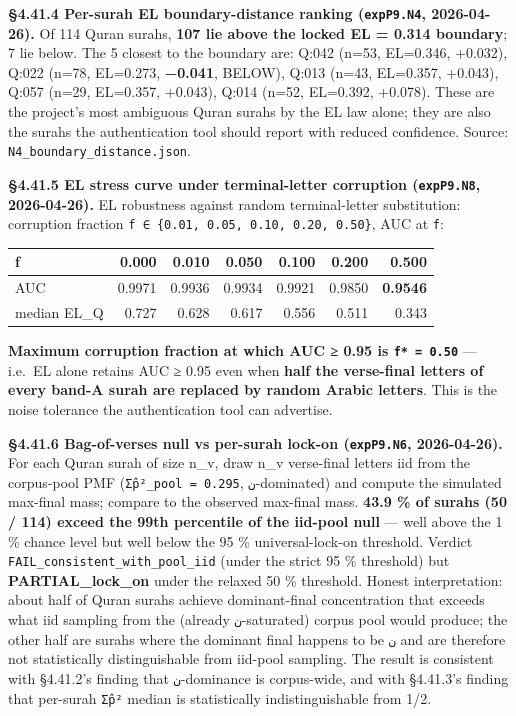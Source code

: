 \documentclass[
]{article}
\newcounter{none} %
\begin{document}
\textbf{§4.41.4 Per-surah EL boundary-distance ranking
(\texttt{expP9.N4}, 2026-04-26).} Of 114 Quran surahs, \textbf{107 lie
above the locked EL = 0.314 boundary}; 7 lie below. The 5 closest to the
boundary are: Q:042 (n=53, EL=0.346, +0.032), Q:022 (n=78, EL=0.273,
\textbf{−0.041}, BELOW), Q:013 (n=43, EL=0.357, +0.043), Q:057 (n=29,
EL=0.357, +0.043), Q:014 (n=52, EL=0.392, +0.078). These are the
project's most ambiguous Quran surahs by the EL law alone; they are also
the surahs the authentication tool should report with reduced
confidence. Source: \texttt{N4\_boundary\_distance.json}.

\textbf{§4.41.5 EL stress curve under terminal-letter corruption
(\texttt{expP9.N8}, 2026-04-26).} EL robustness against random
terminal-letter substitution: corruption fraction
\texttt{f\ ∈\ \{0.01,\ 0.05,\ 0.10,\ 0.20,\ 0.50\}}, AUC at \texttt{f}:

{\def\LTcaptype{none} %
\begin{longtable}[]{@{}lrrrrrr@{}}
\toprule\noalign{}
f & 0.000 & 0.010 & 0.050 & 0.100 & 0.200 & 0.500 \\
\midrule\noalign{}
\endhead
\bottomrule\noalign{}
\endlastfoot
AUC & 0.9971 & 0.9936 & 0.9934 & 0.9921 & 0.9850 & \textbf{0.9546} \\
median EL\_Q & 0.727 & 0.628 & 0.617 & 0.556 & 0.511 & 0.343 \\
\end{longtable}
}

\textbf{Maximum corruption fraction at which AUC ≥ 0.95 is
\texttt{f*\ =\ 0.50}} --- i.e.~EL alone retains AUC ≥ 0.95 even when
\textbf{half the verse-final letters of every band-A surah are replaced
by random Arabic letters}. This is the noise tolerance the
authentication tool can advertise.

\textbf{§4.41.6 Bag-of-verses null vs per-surah lock-on
(\texttt{expP9.N6}, 2026-04-26).} For each Quran surah of size n\_v,
draw n\_v verse-final letters iid from the corpus-pool PMF
(\texttt{Σp̂²\_pool\ =\ 0.295}, \texttt{ن}-dominated) and compute the
simulated max-final mass; compare to the observed max-final mass.
\textbf{43.9 \% of surahs (50 / 114) exceed the 99th percentile of the
iid-pool null} --- well above the 1 \% chance level but well below the
95 \% universal-lock-on threshold. Verdict
\texttt{FAIL\_consistent\_with\_pool\_iid} (under the strict 95 \%
threshold) but \textbf{PARTIAL\_lock\_on} under the relaxed 50 \%
threshold. Honest interpretation: about half of Quran surahs achieve
dominant-final concentration that exceeds what iid sampling from the
(already \texttt{ن}-saturated) corpus pool would produce; the other half
are surahs where the dominant final happens to be \texttt{ن} and are
therefore not statistically distinguishable from iid-pool sampling. The
result is consistent with §4.41.2's finding that \texttt{ن}-dominance is
corpus-wide, and with §4.41.3's finding that per-surah \texttt{Σp̂²}
median is statistically indistinguishable from 1/2.
\end{document}
